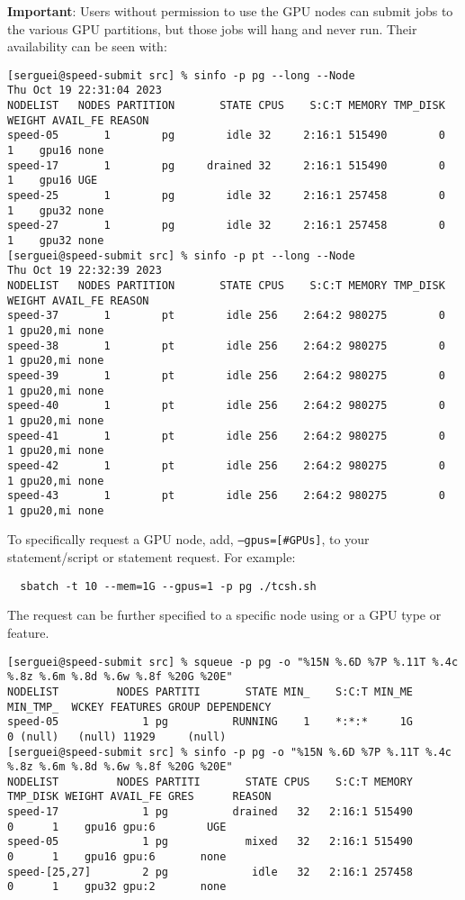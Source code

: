 \noindent \textbf{Important}:
Users without permission to use the GPU nodes can submit jobs to the various GPU
partitions, but those jobs will hang and never run.
Their availability can be seen with:
%
\small
\begin{verbatim}
[serguei@speed-submit src] % sinfo -p pg --long --Node
Thu Oct 19 22:31:04 2023
NODELIST   NODES PARTITION       STATE CPUS    S:C:T MEMORY TMP_DISK WEIGHT AVAIL_FE REASON
speed-05       1        pg        idle 32     2:16:1 515490        0      1    gpu16 none
speed-17       1        pg     drained 32     2:16:1 515490        0      1    gpu16 UGE
speed-25       1        pg        idle 32     2:16:1 257458        0      1    gpu32 none
speed-27       1        pg        idle 32     2:16:1 257458        0      1    gpu32 none
[serguei@speed-submit src] % sinfo -p pt --long --Node
Thu Oct 19 22:32:39 2023
NODELIST   NODES PARTITION       STATE CPUS    S:C:T MEMORY TMP_DISK WEIGHT AVAIL_FE REASON
speed-37       1        pt        idle 256    2:64:2 980275        0      1 gpu20,mi none
speed-38       1        pt        idle 256    2:64:2 980275        0      1 gpu20,mi none
speed-39       1        pt        idle 256    2:64:2 980275        0      1 gpu20,mi none
speed-40       1        pt        idle 256    2:64:2 980275        0      1 gpu20,mi none
speed-41       1        pt        idle 256    2:64:2 980275        0      1 gpu20,mi none
speed-42       1        pt        idle 256    2:64:2 980275        0      1 gpu20,mi none
speed-43       1        pt        idle 256    2:64:2 980275        0      1 gpu20,mi none
\end{verbatim}
\normalsize

\noindent
To specifically request a GPU node, add, \texttt{--gpus=[\#GPUs]},
to your  statement/script or  statement request.
For example:
\begin{verbatim}
  sbatch -t 10 --mem=1G --gpus=1 -p pg ./tcsh.sh
\end{verbatim}
The request can be further specified to a specific node using 
or a GPU type or feature.

\footnotesize
\begin{verbatim}
[serguei@speed-submit src] % squeue -p pg -o "%15N %.6D %7P %.11T %.4c %.8z %.6m %.8d %.6w %.8f %20G %20E"
NODELIST         NODES PARTITI       STATE MIN_    S:C:T MIN_ME MIN_TMP_  WCKEY FEATURES GROUP DEPENDENCY
speed-05             1 pg          RUNNING    1    *:*:*     1G        0 (null)   (null) 11929     (null)
[serguei@speed-submit src] % sinfo -p pg -o "%15N %.6D %7P %.11T %.4c %.8z %.6m %.8d %.6w %.8f %20G %20E"
NODELIST         NODES PARTITI       STATE CPUS    S:C:T MEMORY TMP_DISK WEIGHT AVAIL_FE GRES      REASON
speed-17             1 pg          drained   32   2:16:1 515490        0      1    gpu16 gpu:6        UGE
speed-05             1 pg            mixed   32   2:16:1 515490        0      1    gpu16 gpu:6       none
speed-[25,27]        2 pg             idle   32   2:16:1 257458        0      1    gpu32 gpu:2       none
\end{verbatim}
\normalsize

